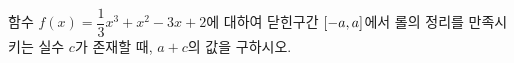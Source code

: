 함수 $f(x)=\dfrac{1}{3}x^3+x^2-3x+2$에 대하여 닫힌구간 $[-a{,}\mkern3mu\mathopen{}a]$에서 롤의 정리를 만족시키는 실수 $c$가 존재할 때, $a+c$의 값을 구하시오. 
